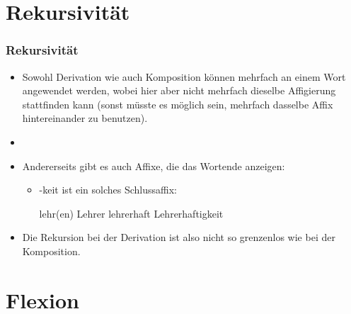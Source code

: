 \section{Rekursivität}



\begin{frame}
\frametitle{Rekursivität}

\begin{itemize}
	\item Sowohl Derivation wie auch Komposition können mehrfach an einem Wort angewendet werden, wobei hier aber nicht mehrfach dieselbe Affigierung stattfinden kann (sonst müsste es möglich sein, mehrfach dasselbe Affix hintereinander zu benutzen).
	\item[]
	\item Andererseits gibt es auch Affixe, die das Wortende anzeigen:
	
	\begin{itemize}
		\item -keit ist ein solches Schlussaffix:
		
		\ea lehr(en) \ras Lehrer \ras lehrerhaft \ras Lehrerhaftigkeit
		\z
		
	\end{itemize}
	
	\item Die Rekursion bei der Derivation ist also nicht so grenzenlos wie bei der Komposition.
	
\end{itemize}


\end{frame}


\section{Flexion}



